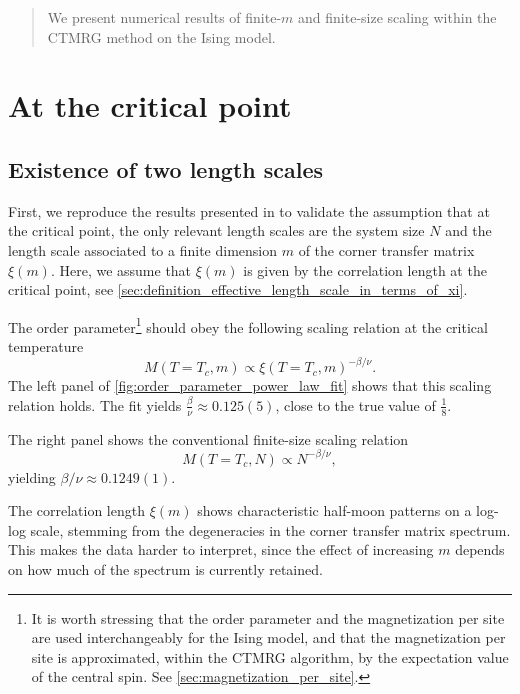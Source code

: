 \begin{abstract}
We present numerical results of finite-$m$ and finite-size scaling within the CTMRG method on the
Ising model.
\end{abstract}

\section{At the critical point}

\subsection{Existence of two length scales}

First, we reproduce the results presented in \cite{nishino1996numerical} to validate the assumption that at the critical
point, the only relevant length scales are the system size $N$ and the length scale associated to a finite dimension $m$
of the corner transfer matrix $\xi(m)$.
Here, we assume that $\xi(m)$ is given by the correlation length at the critical point,
see \autoref{sec:definition_effective_length_scale_in_terms_of_xi}.

The order parameter\footnote{It is worth stressing that the order parameter and the magnetization per site are used
interchangeably for the Ising model, and that the magnetization per site is approximated,
within the CTMRG algorithm, by the expectation value of the central spin.
See \autoref{sec:magnetization_per_site}.} should obey the following scaling relation at the critical temperature
\begin{equation}\label{eq:order_param_scaling_relation_finite_m}
  M(T = T_c,m) \propto \xi(T = T_c, m)^{-\beta/\nu}.
\end{equation}
The left panel of \autoref{fig:order_parameter_power_law_fit} shows that this scaling relation holds.
The fit yields $\frac{\beta}{\nu} \approx 0.125(5)$, close to the true value of $\frac{1}{8}$.

The right panel shows the conventional finite-size scaling relation
\begin{equation}\label{eq:order_param_scaling_relation_finite_N}
  M(T = T_c, N) \propto N^{-\beta/\nu},
\end{equation}
yielding $\beta/\nu \approx 0.1249(1)$.

The correlation length $\xi(m)$ shows characteristic half-moon patterns on a
log-log scale, stemming from the degeneracies in the corner transfer matrix spectrum. This
makes the data harder to interpret, since the effect of increasing $m$ depends on how much
of the spectrum is currently retained.

